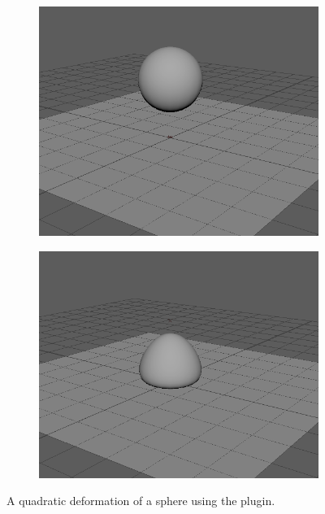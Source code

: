 \begin{figure}
\begin{subfigure}{.3\textwidth}
  \centering
  \includegraphics[width=0.9\linewidth]{img/def1.png}
  \caption{}
  \label{fig:sfig1}
\end{subfigure}%
\begin{subfigure}{.3\textwidth}
  \centering
  \includegraphics[width=0.9\linewidth]{img/def2.png}
  \caption{}
  \label{fig:sfig2}
\end{subfigure}
\caption{A quadratic deformation of a sphere using the plugin.}
\label{fig:maya}
\end{figure}



